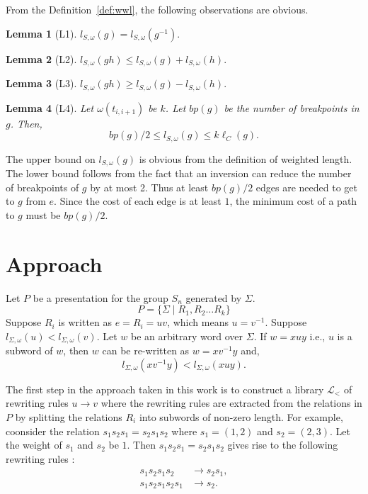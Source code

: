 \documentclass{article}
\newtheorem*{lemma}{Lemma}
\newcommand{\newl}{\ell}
\begin{document}
  



From the Definition~\ref{def:wwl}, the following observations are obvious.

\begin{lemma}[L1]
$l_{S,\omega}(g) = l_{S,\omega}(g^{-1}).$
\end{lemma}

\begin{lemma}[L2]
$l_{S,\omega}(g h) \leq l_{S,\omega}(g) + l_{S,\omega}(h).$
\end{lemma}

\begin{lemma}[L3]
$l_{S,\omega}(g h) \geq l_{S,\omega}(g) - l_{S,\omega}(h).$
\end{lemma}

\begin{lemma}[L4]
Let $\omega(t_{i,i+1})$ be $k$. Let $bp(g)$ be the number of breakpoints in $g$. Then,
\[ bp(g)/2 \leq l_{S,\omega}(g) \leq k \newl_C(g).\]
\end{lemma}

The upper bound on $l_{S,\omega}(g)$ is obvious from the definition of weighted length. The lower bound follows from the fact that an inversion can reduce the number of breakpoints of $g$ by at most 2. Thus at least $bp(g)/2$ edges are needed to get to $g$ from $e$. Since the cost of each edge is at least $1$, the minimum cost of a path to $g$ must be $bp(g)/2$.
\section{Approach}
\label{sec:app}

Let $P$ be a presentation for the group $S_n$ generated by $\Sigma$.
\[ P = \{\Sigma \mid R_1, R_2 \hdots R_k \}\]
Suppose $R_i$  is written as $e = R_i = uv$, which means $u = v^{-1}$. Suppose $l_{\Sigma,\omega}(u) < l_{\Sigma,\omega}(v)$. Let $w$ be an arbitrary word over $\Sigma$. If $w = x u y$ i.e., $u$ is a subword of $w$, then $w$ can be re-written as $w = x v^{-1} y$ and,
\[ l_{\Sigma,\omega}(x v^{-1} y) < l_{\Sigma,\omega}(x u y).\]

The first step in the approach taken in this work is to construct a library $\mathcal{L}_{<}$ of rewriting rules $u \rightarrow v$ where the rewriting rules are extracted from the relations in $P$ by splitting the relations $R_i$ into subwords of non-zero length. For example, coonsider the relation $s_1 s_2 s_1 = s_2 s_1 s_2$ where $s_1 = (1, 2)$ and $s_2 = (2, 3)$. Let the weight of $s_1$ and $s_2$ be $1$. Then $s_1 s_2 s_1 = s_2 s_1 s_2$ gives rise to the following rewriting rules :
\begin{align*}
s_1 s_2 s_1 s_2 &\rightarrow s_2 s_1, \\
s_1 s_2 s_1 s_2 s_1 &\rightarrow s_2. \\
\end{align*}
\end{document}
